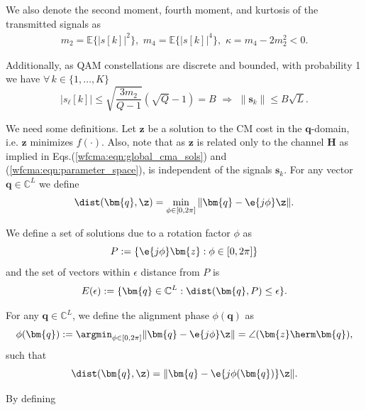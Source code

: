 We also denote the second moment, fourth moment, and kurtosis of the transmitted signals as
\begin{eqnarray}
m_2=\mathbb{E}\{|s[k]|^2\}, \,\, m_4=\mathbb{E}\{|s[k]|^4\}, \,\,\kappa=m_4-2 m_2^2<0.
\end{eqnarray}

Additionally, as QAM constellations are discrete and bounded, with probability 1 we have $\forall\,k\in\{1,\ldots,K\}$
\begin{equation}
\big|{s}_{\ell}[k]\big|\leq \sqrt{\frac{3m_2}{Q-1}}(\sqrt{Q}-1)= B\,\,\Rightarrow\,\,\|\bm{s}_k\|\leq B\sqrt{L}.
\end{equation}

We need some definitions. Let $\bm{z}$ be a solution to the CM cost in the $\bm{q}$-domain, i.e. 
$\bm{z}$ minimizes $f(\cdot)$. Also, note that as $\bm{z}$ is related only to the channel $\bm{H}$ as implied in Eqs.(\ref{wfcma:eqn:global_cma_sols}) and (\ref{wfcma:eqn:parameter_space}), is independent of the signals $\bm{s}_k$.
For any vector $\bm{q}\in\mathbb{C}^L$ we define
\begin{equation}
\dist(\bm{q},\z)=\min_{\phi\in[0,2\pi]}\|\bm{q}-\e{j\phi}\z\|.
\end{equation}

We define a set of solutions due to a rotation factor $\phi$ as
\begin{equation}
P:=\{\e{j\phi}\bm{z}:\phi\in[0,2\pi]\}
\end{equation}
and the set of vectors within $\epsilon$ distance from $P$ is
\begin{equation}
E(\epsilon):=\{\bm{q}\in\mathbb{C}^L:\dist(\bm{q},P)\leq\epsilon\}.
\end{equation}

For any $\bm{q}\in\mathbb{C}^L$, we define the alignment phase $\phi(\bm{q})$ as
\begin{equation}
\phi(\bm{q}):=\argmin_{\phi\in[0,2\pi]}\|\bm{q}-\e{j\phi}\z\|=\angle(\bm{z}\herm\bm{q}),
\end{equation}
such that
\begin{equation}
\dist(\bm{q},\z)=\|\bm{q}-\e{j\phi(\bm{q})}\z\|.
\end{equation}

By defining

